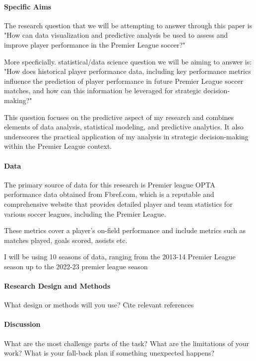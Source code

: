 \documentclass[12pt]{article}
\begin{document}
\paragraph{Specific Aims}

The research question that we will be attempting to answer through this paper is
"How can data visualization and predictive analysis be used to assess and 
improve player performance in the Premier League soccer?"

More specficially. statistical/data science question we will be aiming to answer
is: "How does historical player performance data, including key performance
metrics influence the prediction of player performance in future Premier League 
soccer matches, and how can this information be leveraged for strategic 
decision-making?"

This question focuses on the predictive aspect of my research and combines
elements of data analysis, statistical modeling, and predictive analytics. 
It also underscores the practical application of my analysis in strategic 
decision-making within the Premier League context.




\paragraph{Data}
The primary source of data for this research is Premier league OPTA performance 
data obtained from Fbref.com, which is a reputable and comprehensive website 
that provides detailed player and team statistics for various soccer leagues, 
including the Premier League.

These metrics cover a player's on-field performance and include metrics such as
matches played, goals scored, assists etc. 

I will be using 10 seasons of data, ranging from the 2013-14 Premier League
season up to the 2022-23 premier league season 




\paragraph{Research Design and Methods}
What design or methods will you use?
Cite relevant references~ %



\paragraph{Discussion}
What are the most challenge parts of the task?
What are the limitations of your work? What is your fall-back plan if
something unexpected happens?





\end{document}
